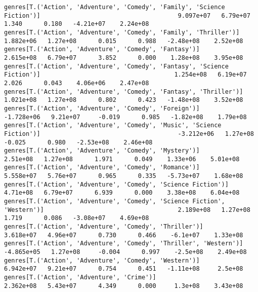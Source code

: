 \documentclass[11pt]{article}
\begin{document}
\begin{Verbatim}[commandchars=\\\{\}]
genres[T.('Action', 'Adventure', 'Comedy', 'Family', 'Science Fiction')]                                      9.097e+07   6.79e+07      1.340      0.180   -4.21e+07    2.24e+08
genres[T.('Action', 'Adventure', 'Comedy', 'Family', 'Thriller')]                                             1.882e+06   1.27e+08      0.015      0.988   -2.48e+08    2.52e+08
genres[T.('Action', 'Adventure', 'Comedy', 'Fantasy')]                                                        2.615e+08   6.79e+07      3.852      0.000    1.28e+08    3.95e+08
genres[T.('Action', 'Adventure', 'Comedy', 'Fantasy', 'Science Fiction')]                                     1.254e+08   6.19e+07      2.026      0.043    4.06e+06    2.47e+08
genres[T.('Action', 'Adventure', 'Comedy', 'Fantasy', 'Thriller')]                                            1.021e+08   1.27e+08      0.802      0.423   -1.48e+08    3.52e+08
genres[T.('Action', 'Adventure', 'Comedy', 'Foreign')]                                                       -1.728e+06   9.21e+07     -0.019      0.985   -1.82e+08    1.79e+08
genres[T.('Action', 'Adventure', 'Comedy', 'Music', 'Science Fiction')]                                      -3.212e+06   1.27e+08     -0.025      0.980   -2.53e+08    2.46e+08
genres[T.('Action', 'Adventure', 'Comedy', 'Mystery')]                                                         2.51e+08   1.27e+08      1.971      0.049    1.33e+06    5.01e+08
genres[T.('Action', 'Adventure', 'Comedy', 'Romance')]                                                        5.558e+07   5.76e+07      0.965      0.335   -5.73e+07    1.68e+08
genres[T.('Action', 'Adventure', 'Comedy', 'Science Fiction')]                                                 4.71e+08   6.79e+07      6.939      0.000    3.38e+08    6.04e+08
genres[T.('Action', 'Adventure', 'Comedy', 'Science Fiction', 'Western')]                                     2.189e+08   1.27e+08      1.719      0.086   -3.08e+07    4.69e+08
genres[T.('Action', 'Adventure', 'Comedy', 'Thriller')]                                                       3.618e+07   4.96e+07      0.730      0.466    -6.1e+07    1.33e+08
genres[T.('Action', 'Adventure', 'Comedy', 'Thriller', 'Western')]                                           -4.865e+05   1.27e+08     -0.004      0.997    -2.5e+08    2.49e+08
genres[T.('Action', 'Adventure', 'Comedy', 'Western')]                                                        6.942e+07   9.21e+07      0.754      0.451   -1.11e+08     2.5e+08
genres[T.('Action', 'Adventure', 'Crime')]                                                                    2.362e+08   5.43e+07      4.349      0.000     1.3e+08    3.43e+08

\end{Verbatim}
\end{document}
